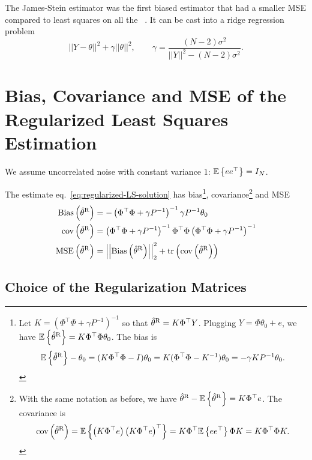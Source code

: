 The James-Stein estimator was the first biased estimator that had a smaller MSE compared to least squares on all the ~\cite[page~3]{pillonetto}. It can be cast into a ridge regression problem
\begin{equation*}
  ||Y-\theta||^2 + \gamma ||\theta||^2,\hspace{2em} \gamma = \frac{(N-2)\sigma^2}{||Y||^2 - (N-2)\sigma^2}.
\end{equation*}

\section{Bias, Covariance and MSE of the Regularized Least Squares Estimation}
\label{sec:bias-covariance-MSE-regLS-estimation}

We assume uncorrelated noise with constant variance $1$: $\mathbb{E}\left\{e e^\top\right\} = I_N$.

The estimate eq.~\eqref{eq:regularized-LS-solution} has bias\footnote{Let $K = \left(\Phi^\top\Phi + \gamma P^{-1}\right)^{-1}$ so that $\hat{\theta}^\textrm{R} = K\Phi^\top Y$. Plugging $Y=\Phi\theta_0+e$, we have $\mathbb{E}\left\{\hat{\theta}^\textrm{R}\right\} = K\Phi^\top\Phi\theta_0$. The bias is
  \begin{equation*}
    \mathbb{E}\left\{\hat{\theta}^\textrm{R}\right\} - \theta_0 = (K\Phi^\top\Phi - I)\theta_0 = K(\Phi^\top\Phi - K^{-1})\theta_0 = -\gamma KP^{-1}\theta_0.
  \end{equation*}}, covariance\footnote{With the same notation as before, we have $\hat{\theta}^\textrm{R} - \mathbb{E}\left\{\hat{\theta}^\textrm{R}\right\} = K\Phi^\top e$. The covariance is
  \begin{equation*}
    \textrm{cov}\left(\hat{\theta}^\textrm{R}\right) = \mathbb{E}\left\{\left(K\Phi^\top e\right) \left(K\Phi^\top e\right)^\top\right\} = K\Phi^\top \mathbb{E}\left\{e e^\top\right\} \Phi K = K\Phi^\top\Phi K.
  \end{equation*}} and MSE
\begin{align*}
  \textrm{Bias}\left(\hat{\theta}^\textrm{R}\right) &= -\left(\Phi^\top\Phi + \gamma P^{-1}\right)^{-1}\gamma P^{-1}\theta_0 \\
  \textrm{cov}\left(\hat{\theta}^\textrm{R}\right) &= \left(\Phi^\top\Phi + \gamma P^{-1}\right)^{-1} \Phi^\top\Phi \left(\Phi^\top\Phi + \gamma P^{-1}\right)^{-1} \\
  \textrm{MSE}\left(\hat{\theta}^\textrm{R}\right) &= \left|\left|\textrm{Bias}\left(\hat{\theta}^\textrm{R}\right)\right|\right|_2^2 + \textrm{tr}\left(\textrm{cov}\left(\hat{\theta}^\textrm{R}\right)\right)
\end{align*}

\subsection{Choice of the Regularization Matrices}
\label{sec:regularization-matrices}

